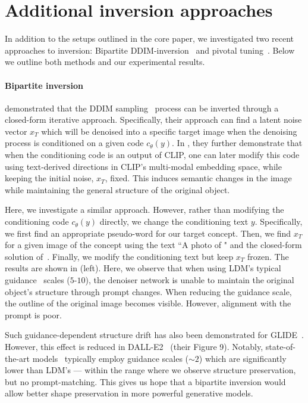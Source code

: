 \section{Additional inversion approaches}

In addition to the setups outlined in the core paper, we investigated two recent approaches to inversion: Bipartite DDIM-inversion~\citep{ramesh2022hierarchical,dhariwal2021diffusion} and pivotal tuning~\citep{roich2021pivotal}. Below we outline both methods and our experimental results.

\paragraph{Bipartite inversion}
\citet{dhariwal2021diffusion} demonstrated that the DDIM sampling~\citep{song2020denoising} process can be inverted through a closed-form iterative approach. Specifically, their approach can find a latent noise vector $x_T$ which will be denoised into a specific target image when the denoising process is conditioned on a given code $c_\theta(y)$. In \citep{ramesh2022hierarchical}, they further demonstrate that when the conditioning code is an output of CLIP, one can later modify this code using text-derived directions in CLIP's multi-modal embedding space, while keeping the initial noise, $x_T$, fixed. This induces semantic changes in the image while maintaining the general structure of the original object.



Here, we investigate a similar approach. However, rather than modifying the conditioning code $c_\theta(y)$ directly, we change the conditioning text $y$. Specifically, we first find an appropriate pseudo-word for our target concept. Then, we find $x_T$ for a given image of the concept using the text ``A photo of \pholdercolor" and the closed-form solution of~\citet{dhariwal2021diffusion}. Finally, we modify the conditioning text but keep $x_T$ frozen. The results are shown in  (left). Here, we observe that when using LDM's typical guidance~\citep{ho2021classifier} scales ($5$-$10$), the denoiser network is unable to maintain the original object's structure through prompt changes. When reducing the guidance scale, the outline of the original image becomes visible. However, alignment with the prompt is poor.

Such guidance-dependent structure drift has also been demonstrated for GLIDE~\citep{nichol2021glide}. However, this effect is reduced in DALL-E2~\citep{ramesh2022hierarchical} (their Figure 9). Notably, state-of-the-art models~\citep{saharia2022photorealistic,ramesh2022hierarchical} typically employ guidance scales ($\sim2$) which are significantly lower than LDM's --- within the range where we observe structure preservation, but no prompt-matching. This gives us hope that a bipartite inversion would allow better shape preservation in more powerful generative models.

